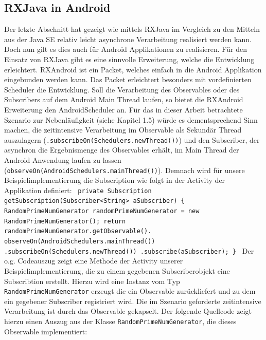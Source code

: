 \documentclass[12pt,oneside,a4paper,bibtotoc,liststotoc]{scrreprt}
\begin{document}
\subsection{RXJava in Android}
Der letzte Abschnitt hat gezeigt wie mittels RXJava im Vergleich zu den Mitteln aus der Java SE relativ leicht asynchrone Verarbeitung realisiert werden kann. Doch nun gilt es dies auch für Android Applikationen zu realisieren. Für den Einsatz von RXJava gibt es eine sinnvolle Erweiterung, welche die Entwicklung erleichtert. RXAndroid ist ein Packet, welches einfach in die Android Applikation eingebunden werden kann. Das Packet erleichtert besonders mit vordefinierten Scheduler die Entwicklung. Soll die Verarbeitung des Observables oder des Subscribers auf dem Android Main Thread laufen, so bietet die RXAndroid Erweiterung den AndroidScheduler an. Für das in dieser Arbeit betrachtete Szenario zur Nebenläufigkeit (siehe Kapitel 1.5) würde es dementsprechend Sinn machen, die zeitintensive Verarbeitung im Observable als Sekundär Thread auszulagern (\texttt{.subscribeOn(Schedulers.newThread())}) und den Subscriber, der asynchron die Ergebnismenge des Observables erhält, im Main Thread der Android Anwendung laufen zu lassen (\texttt{observeOn(AndroidSchedulers.mainThread())}). Demnach wird für unsere Beispielimplementierung die Subscription wie folgt in der Activity der Applikation definiert:\newline
\texttt{\newline
private Subscription getSubscription(Subscriber<String> aSubscriber) \{\newline
       RandomPrimeNumGenerator randomPrimeNumGenerator =\newline 
       new RandomPrimeNumGenerator();\newline
\newline
       return randomPrimeNumGenerator.getObservable().\newline
       observeOn(AndroidSchedulers.mainThread())\newline
               .subscribeOn(Schedulers.newThread())\newline
               .subscribe(aSubscriber);\newline
   \}\newline
   }\newline
Der o.g. Codeauszug zeigt eine Methode der Activity unserer Beispielimplementierung, die zu einem gegebenen Subscriberobjekt eine Subscribtion erstellt. Hierzu wird eine Instanz vom Typ \texttt{RandomPrimeNumGenerator} erzeugt die ein Observable zurückliefert und zu dem ein gegebener Subscriber registriert wird. Die im Szenario geforderte zeitintensive Verarbeitung ist durch das Observable gekapselt. Der folgende Quellcode zeigt hierzu einen Auszug aus der Klasse \texttt{RandomPrimeNumGenerator}, die dieses Observable implementiert:\newline
\end{document}
